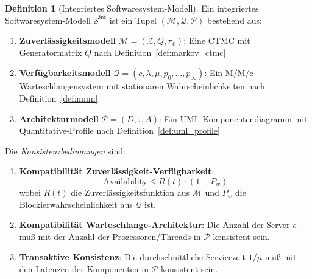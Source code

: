 \documentclass[a4paper,11pt]{article}
\theoremstyle{definition}
\newtheorem{definition}{Definition}
\begin{document}
\begin{definition}[Integriertes Softwaresystem-Modell]
    \label{def:integrated_model}
    Ein integriertes Softwaresystem-Modell $\mathcal{S}^{\text{int}}$ ist ein Tupel 
    $(\mathcal{M}, \mathcal{Q}, \mathcal{P})$ bestehend aus:

    \begin{enumerate}
        \item \textbf{Zuverlässigkeitsmodell} $\mathcal{M} = (\mathcal{Z}, Q, \pi_0)$:
              Eine CTMC mit Generatormatrix $Q$ nach Definition~\ref{def:markov_ctmc}
              
        \item \textbf{Verfügbarkeitsmodell} $\mathcal{Q} = (c, \lambda, \mu, p_0, \ldots, p_{\infty})$:
              Ein M/M/c-Warteschlangensystem mit stationären Wahrscheinlichkeiten 
              nach Definition~\ref{def:mmn}
              
        \item \textbf{Architekturmodell} $\mathcal{P} = (D, \tau, A)$:
              Ein UML-Komponentendiagramm mit Quantitative-Profile nach Definition~\ref{def:uml_profile}
    \end{enumerate}

    Die \emph{Konsistenzbedingungen} sind:
    \begin{enumerate}
        \item \textbf{Kompatibilität Zuverlässigkeit-Verfügbarkeit}:
        \[
            \text{Availability} \leq R(t) \cdot (1 - P_w)
        \]
        wobei $R(t)$ die Zuverlässigkeitsfunktion aus $\mathcal{M}$ und $P_w$ die 
        Blockierwahrscheinlichkeit aus $\mathcal{Q}$ ist.

        \item \textbf{Kompatibilität Warteschlange-Architektur}:
        Die Anzahl der Server $c$ muß mit der Anzahl der Prozessoren/Threads in $\mathcal{P}$ 
        konsistent sein.

        \item \textbf{Transaktive Konsistenz}:
        Die durchschnittliche Servicezeit $1/\mu$ muß mit den Latenzen der Komponenten 
        in $\mathcal{P}$ konsistent sein.
    \end{enumerate}
\end{definition}
\end{document}
